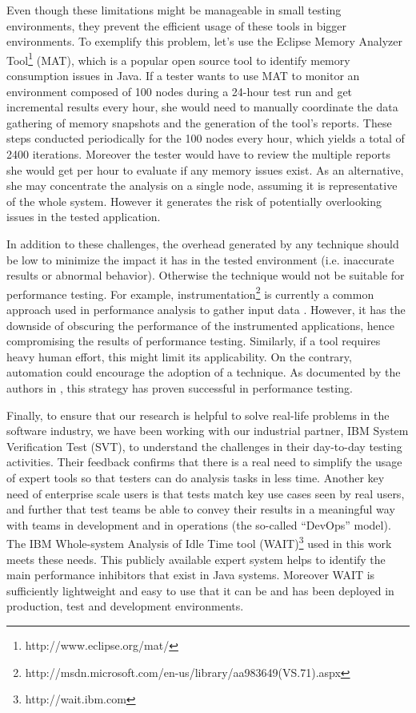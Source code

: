 \documentclass[runningheads,a4paper]{llncs}
\begin{document}
Even though these limitations might be manageable in small testing environments,
they prevent the efficient usage of these tools in bigger environments. To
exemplify this problem, let's use the Eclipse Memory Analyzer
Tool\footnote{http://www.eclipse.org/mat/} (MAT), which is a popular open source
tool to identify memory consumption issues in Java. If a tester wants to use MAT
to monitor an environment composed of 100 nodes during a 24-hour test run and 
get incremental results every hour, she would need to manually coordinate the
data gathering of memory snapshots and the generation of the tool's reports.
These steps conducted periodically for the 100 nodes every hour, which
yields a total of 2400 iterations. Moreover the tester would have to review
the multiple reports she would get per hour to evaluate if any memory issues
exist. As an alternative, she may concentrate the analysis on a single node,
assuming it is representative of the whole system. However it generates the risk of
potentially overlooking issues in the tested application.

In addition to these challenges, the overhead generated by any technique
should be low
to minimize the impact it has in the
tested environment (i.e. inaccurate results or abnormal behavior). Otherwise the
technique would not be suitable for performance testing. For example,
instrumentation\footnote{http://msdn.microsoft.com/en-us/library/aa983649(VS.71).aspx}
is currently a common approach used in performance analysis to gather input data
\cite{Yang1,Hangal1,Csallner1,Chen2}. However, it has the downside of obscuring
the performance of the instrumented applications, hence compromising the results of 
performance testing. Similarly, if a tool requires heavy human effort, this might limit its 
applicability. On the contrary, automation could encourage the adoption of a technique. 
As documented by the authors in \cite{Shahamiri1}, this strategy has proven
successful in performance testing.

Finally, to ensure that our research is helpful to solve real-life
problems in the software industry, we have been working with our industrial
partner, IBM System Verification Test (SVT), to understand the challenges
in their day-to-day testing activities. Their feedback confirms that there is a 
real need to simplify the usage of expert tools so that testers can do
analysis tasks in less time. Another key need of enterprise scale users is that
tests match key use cases seen by real users, and further that test teams be
able to convey their results in a meaningful way with teams in development and
in operations (the so-called “DevOps” model). The IBM Whole-system Analysis of
Idle Time tool (WAIT)\footnote{http://wait.ibm.com} used in this work meets
these needs. This publicly available expert system helps to identify the
main performance inhibitors that exist in Java systems. Moreover WAIT is
sufficiently lightweight and easy to use that it can be and has been deployed in
production, test and development environments.
\end{document}
